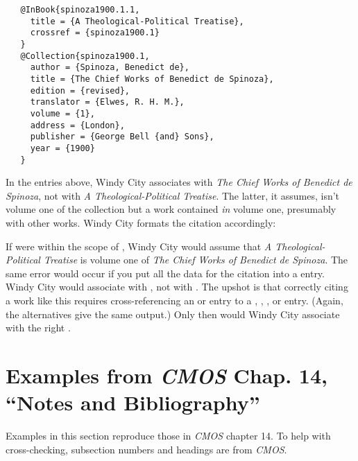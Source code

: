 \documentclass[11pt,letterpaper,oneside]{article}
\begin{document}
\begin{verbatim}
   @InBook{spinoza1900.1.1,
     title = {A Theological-Political Treatise},
     crossref = {spinoza1900.1}
   }
   @Collection{spinoza1900.1,
     author = {Spinoza, Benedict de},
     title = {The Chief Works of Benedict de Spinoza},
     edition = {revised},
     translator = {Elwes, R. H. M.},
     volume = {1},
     address = {London},
     publisher = {George Bell {and} Sons},
     year = {1900}
   }
\end{verbatim}

In the entries above, Windy City associates  with
\textit{The Chief Works of Benedict de Spinoza}, not with \textit{A
Theological-Political Treatise}. The latter, it assumes, isn't volume
one of the collection but a work contained \textit{in} volume one,
presumably with other works. Windy City formats the citation
accordingly:

\begin{citebib}
\item \cite{spinoza1900.1.1}
\end{citebib}

\noindent If  were within the scope of
, Windy City would assume that \textit{A
Theological-Political Treatise} is volume one of \textit{The Chief
Works of Benedict de Spinoza}. The same error would occur if you put
all the data for the citation into a  entry.
Windy City would associate  with ,
not with . The upshot is that correctly citing a
work like this requires cross-referencing an  or
 entry to a , ,
, or  entry. (Again, the
alternatives give the same output.) Only then would Windy City
associate  with the right .

\section{Examples from \emph{CMOS} Chap. 14, ``Notes and
Bibliography''}
\label{notes}

Examples in this section reproduce those in \textit{CMOS} chapter 14.
To help with cross-checking, subsection numbers and headings are from
\textit{CMOS}.

\end{document}
